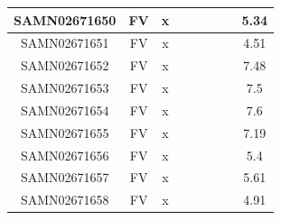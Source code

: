 \documentclass[../main.tex]{subfiles}
\begin{document}
\begin{flushleft}
\begin{footnotesize}
\begin{longtable}{|c|c|c|c|c|c|c|}
    \hline
    SAMN02671650  & FV    & x                                                            & ~          & ~                                                                           & ~                                                                 & 5.34      \\ 
    \hline
    SAMN02671651  & FV    & x                                                            & ~          & ~                                                                           & ~                                                                 & 4.51      \\ 
    \hline
    SAMN02671652  & FV    & x                                                            & ~          & ~                                                                           & ~                                                                 & 7.48      \\ 
    \hline
    SAMN02671653  & FV    & x                                                            & ~          & ~                                                                           & ~                                                                 & 7.5       \\ 
    \hline
    SAMN02671654  & FV    & x                                                            & ~          & ~                                                                           & ~                                                                 & 7.6       \\ 
    \hline
    SAMN02671655  & FV    & x                                                            & ~          & ~                                                                           & ~                                                                 & 7.19      \\ 
    \hline
    SAMN02671656  & FV    & x                                                            & ~          & ~                                                                           & ~                                                                 & 5.4       \\ 
    \hline
    SAMN02671657  & FV    & x                                                            & ~          & ~                                                                           & ~                                                                 & 5.61      \\ 
    \hline
    SAMN02671658  & FV    & x                                                            & ~          & ~                                                                           & ~                                                                 & 4.91      \\ 

\end{longtable}
\end{footnotesize}
\end{flushleft}
\end{document}
